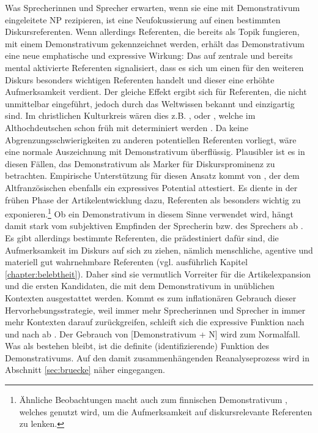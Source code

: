 Was Sprecherinnen und Sprecher erwarten, wenn sie eine mit Demonstrativum eingeleitete NP rezipieren, ist eine Neufokussierung auf einen bestimmten Diskursreferenten. Wenn allerdings Referenten, die bereits als Topik fungieren, mit einem Demonstrativum gekennzeichnet werden, erhält das Demonstrativum eine neue emphatische und expressive Wirkung: Das  auf zentrale und bereits mental aktivierte Referenten signalisiert, dass es sich um einen für den weiteren Diskurs besonders wichtigen Referenten handelt und dieser eine erhöhte Aufmerksamkeit verdient. Der gleiche Effekt ergibt sich für Referenten, die nicht unmittelbar eingeführt, jedoch durch das Weltwissen bekannt und einzigartig sind. Im christlichen Kulturkreis wären dies z.B. ,  oder , welche im Althochdeutschen schon früh mit  determiniert werden \parencite{Oubouzar1989}. Da keine Abgrenzungsschwierigkeiten zu anderen potentiellen Referenten vorliegt,  wäre eine normale Auszeichnung mit Demonstrativum überflüssig. Plausibler ist es in diesen Fällen, das Demonstrativum als Marker für Diskursprominenz zu betrachten. Empirische Unterstützung für diesen Ansatz kommt von \textcite{Epstein1993,Epstein1994}, der dem Altfranzösischen  ebenfalls ein expressives Potential attestiert. Es diente in der frühen Phase der Artikelentwicklung dazu, Referenten als besonders wichtig zu exponieren.\footnote{Ähnliche Beobachtungen macht auch \textcite{Laury1997} zum finnischen Demonstrativum , welches genutzt wird, um die Aufmerksamkeit auf diskursrelevante Referenten zu lenken.} 
Ob ein Demonstrativum in diesem Sinne verwendet wird, hängt damit stark vom subjektiven Empfinden der Sprecherin bzw. des Sprechers ab \parencite[128]{Epstein1993}. Es gibt allerdings bestimmte Referenten, die prädestiniert dafür sind, die Aufmerksamkeit im Diskurs auf sich zu ziehen, nämlich menschliche, agentive und materiell gut wahrnehmbare Referenten (vgl. ausführlich Kapitel \ref{chapter:belebtheit}). Daher sind sie vermutlich Vorreiter für die Artikelexpansion und die ersten Kandidaten, die mit dem Demonstrativum in unüblichen Kontexten ausgestattet werden. Kommt es zum inflationären Gebrauch dieser Hervorhebungsstrategie, weil immer mehr Sprecherinnen und Sprecher in immer mehr Kontexten darauf zurückgreifen, schleift sich die expressive Funktion nach und nach ab \parencite[vgl. das Prinzip der unsichtbaren Hand nach][]{Keller1994}. Der Gebrauch von [Demonstrativum + N] wird zum Normalfall. Was als  bestehen bleibt, ist die definite (identifizierende) Funktion des  Demonstrativums. Auf den damit zusammenhängenden Reanalyseprozess wird in Abschnitt \ref{sec:bruecke} näher eingegangen.  

